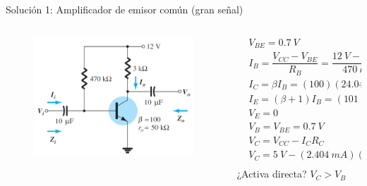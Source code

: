 \documentclass[t,aspectratio=169]{beamer}
\begin{document}
\begin{frame}{Solución 1: Amplificador de emisor común (gran señal)}

\begin{columns}
\begin{column}{0.5\textwidth}

\begin{figure}[H]
    \centering
    \includegraphics[width=\textwidth]{figuras/ejemplo_1_circuito.png}
\end{figure}

\end{column}
\begin{column}{0.5\textwidth}
\begin{align*}
&V_{BE} = 0.7\ V \\
&I_B = \dfrac{V_{CC} - V_{BE}}{R_B} = \dfrac{12\ V - 0.7\ V}{470\ k\Omega} = 24.04\ \mu A \\
&I_C = \beta I_B = (100)(24.04\ \mu A) = 2.404\ mA \\
&I_E = (\beta+1) I_B = (101)(24.04\ \mu A) = 2.428\ mA \\
&V_E = 0 \\
&V_B = V_{BE} = 0.7\ V \\
&V_C = V_{CC} - I_C R_C \\
&V_C = 5\ V - (2.404\ mA)(3\ k\Omega) = 4.788\ V \\
\end{align*}
%
¿Activa directa? $ V_C > V_B $

\end{column}
\end{columns}

\end{frame}
\end{document}
